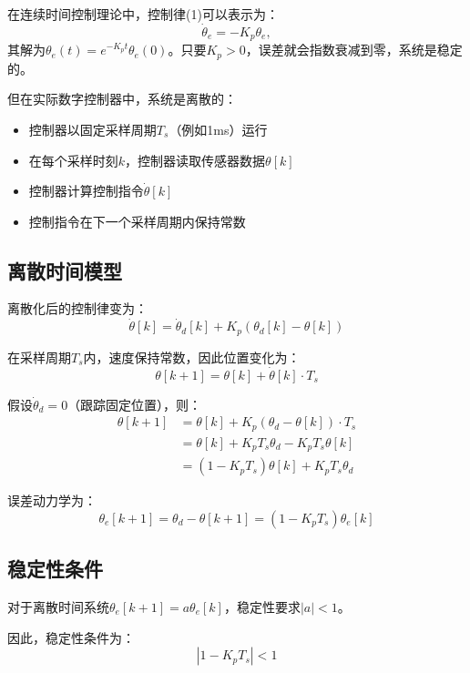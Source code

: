 \documentclass[12pt,a4paper]{article}
\begin{document}
在连续时间控制理论中，控制律(1)可以表示为：
\begin{equation}
\dot{\theta}_e = -K_p \theta_e,
\end{equation}
其解为$\theta_e(t) = e^{-K_p t}\theta_e(0)$。只要$K_p > 0$，误差就会指数衰减到零，系统是稳定的。

但在实际数字控制器中，系统是离散的：
\begin{itemize}
\item 控制器以固定采样周期$T_s$（例如1ms）运行
\item 在每个采样时刻$k$，控制器读取传感器数据$\theta[k]$
\item 控制器计算控制指令$\dot{\theta}[k]$
\item 控制指令在下一个采样周期内保持常数
\end{itemize}

\subsection{离散时间模型}

离散化后的控制律变为：
\begin{equation}
\dot{\theta}[k] = \dot{\theta}_d[k] + K_p(\theta_d[k] - \theta[k])
\end{equation}

在采样周期$T_s$内，速度保持常数，因此位置变化为：
\begin{equation}
\theta[k+1] = \theta[k] + \dot{\theta}[k] \cdot T_s
\end{equation}

假设$\dot{\theta}_d = 0$（跟踪固定位置），则：
\begin{align}
\theta[k+1] &= \theta[k] + K_p(\theta_d - \theta[k]) \cdot T_s \\
&= \theta[k] + K_p T_s \theta_d - K_p T_s \theta[k] \\
&= (1 - K_p T_s)\theta[k] + K_p T_s \theta_d
\end{align}

误差动力学为：
\begin{equation}
\theta_e[k+1] = \theta_d - \theta[k+1] = (1 - K_p T_s)\theta_e[k]
\end{equation}

\subsection{稳定性条件}

对于离散时间系统$\theta_e[k+1] = a \theta_e[k]$，稳定性要求$|a| < 1$。

因此，稳定性条件为：
\begin{equation}
|1 - K_p T_s| < 1
\end{equation}
\end{document}

